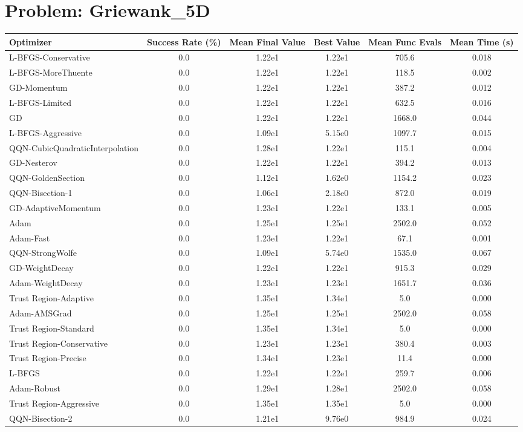 \documentclass{article}
\begin{document}
\section{Problem: Griewank\_5D}
\begin{longtable}{p{3cm}*{5}{c}}
\toprule
\textbf{Optimizer} & \textbf{Success Rate (\%)} & \textbf{Mean Final Value} & \textbf{Best Value} & \textbf{Mean Func Evals} & \textbf{Mean Time (s)} \\
\midrule
L-BFGS-Conservative & 0.0 & 1.22e1 & 1.22e1 & 705.6 & 0.018 \\
L-BFGS-MoreThuente & 0.0 & 1.22e1 & 1.22e1 & 118.5 & 0.002 \\
GD-Momentum & 0.0 & 1.22e1 & 1.22e1 & 387.2 & 0.012 \\
L-BFGS-Limited & 0.0 & 1.22e1 & 1.22e1 & 632.5 & 0.016 \\
GD & 0.0 & 1.22e1 & 1.22e1 & 1668.0 & 0.044 \\
L-BFGS-Aggressive & 0.0 & 1.09e1 & 5.15e0 & 1097.7 & 0.015 \\
QQN-CubicQuadraticInterpolation & 0.0 & 1.28e1 & 1.22e1 & 115.1 & 0.004 \\
GD-Nesterov & 0.0 & 1.22e1 & 1.22e1 & 394.2 & 0.013 \\
QQN-GoldenSection & 0.0 & 1.12e1 & 1.62e0 & 1154.2 & 0.023 \\
QQN-Bisection-1 & 0.0 & 1.06e1 & 2.18e0 & 872.0 & 0.019 \\
GD-AdaptiveMomentum & 0.0 & 1.23e1 & 1.22e1 & 133.1 & 0.005 \\
Adam & 0.0 & 1.25e1 & 1.25e1 & 2502.0 & 0.052 \\
Adam-Fast & 0.0 & 1.23e1 & 1.22e1 & 67.1 & 0.001 \\
QQN-StrongWolfe & 0.0 & 1.09e1 & 5.74e0 & 1535.0 & 0.067 \\
GD-WeightDecay & 0.0 & 1.22e1 & 1.22e1 & 915.3 & 0.029 \\
Adam-WeightDecay & 0.0 & 1.23e1 & 1.23e1 & 1651.7 & 0.036 \\
Trust Region-Adaptive & 0.0 & 1.35e1 & 1.34e1 & 5.0 & 0.000 \\
Adam-AMSGrad & 0.0 & 1.25e1 & 1.25e1 & 2502.0 & 0.058 \\
Trust Region-Standard & 0.0 & 1.35e1 & 1.34e1 & 5.0 & 0.000 \\
Trust Region-Conservative & 0.0 & 1.23e1 & 1.23e1 & 380.4 & 0.003 \\
Trust Region-Precise & 0.0 & 1.34e1 & 1.23e1 & 11.4 & 0.000 \\
L-BFGS & 0.0 & 1.22e1 & 1.22e1 & 259.7 & 0.006 \\
Adam-Robust & 0.0 & 1.29e1 & 1.28e1 & 2502.0 & 0.058 \\
Trust Region-Aggressive & 0.0 & 1.35e1 & 1.35e1 & 5.0 & 0.000 \\
QQN-Bisection-2 & 0.0 & 1.21e1 & 9.76e0 & 984.9 & 0.024 \\
\bottomrule
\end{longtable}
\end{document}
